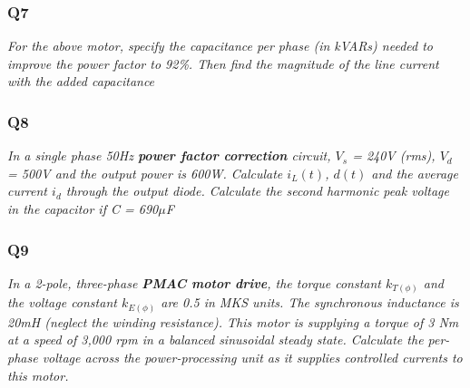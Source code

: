 \documentclass[a4paper,11pt]{article}
\begin{document}
\subsubsection*{Q7}
\textit{For the above motor, specify the capacitance per phase (in kVARs) needed to improve the power factor to 92\%. Then find the magnitude of the line current with the added capacitance}



\subsubsection*{Q8}
\textit{In a single phase 50Hz \textbf{power factor correction} circuit, $V_s$ = 240V (rms), $V_d$ = 500V and the output power is 600W. Calculate $i_L(t)$, $d(t)$ and the average current $i_d$ through the output diode. Calculate the second harmonic peak voltage in the capacitor if C = 690$\mu$F}



\subsubsection*{Q9}
\textit{In a 2-pole, three-phase \textbf{PMAC motor drive}, the torque constant $k_{T(\phi)}$ and the voltage constant $k_{E(\phi)}$ are 0.5 in MKS units. The synchronous inductance is 20mH (neglect the winding resistance). This motor is supplying a torque of 3 Nm at a speed of 3,000 rpm in a balanced sinusoidal steady state. Calculate the per-phase voltage across the power-processing unit as it supplies controlled currents to this motor.}
\end{document}
